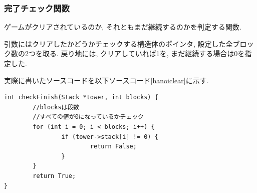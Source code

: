 \documentclass[a4j]{jsarticle}
\begin{document}
        \subsubsection{完了チェック関数}
        ゲームがクリアされているのか, それともまだ継続するのかを判定する関数. 
        
        引数にはクリアしたかどうかチェックする構造体のポインタ, 設定した全ブロック数の2つを取る. 戻り地には, クリアしていれば1を, まだ継続する場合は0を指定した. 
        
        実際に書いたソースコードを以下ソースコード\ref{hanoiclear}に示す. 
        \begin{lstlisting}[label = hanoiclear, caption = 完了チェック関数]
int checkFinish(Stack *tower, int blocks) {
        //blocksは段数
        //すべての値が0になっているかチェック
        for (int i = 0; i < blocks; i++) {
                if (tower->stack[i] != 0) {
                        return False;
                }
        }
        return True;
}
        \end{lstlisting}
        
        
\end{document}
